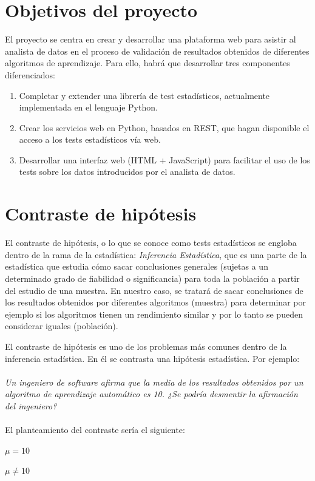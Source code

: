 \section{Objetivos del proyecto}
El proyecto se centra en crear y desarrollar una plataforma web para asistir al analista de datos
en el proceso de validación de resultados obtenidos de diferentes algoritmos de aprendizaje.
Para ello, habrá que desarrollar tres componentes diferenciados:
\begin{enumerate}
\item Completar y extender una librería de test estadísticos, actualmente implementada en el
lenguaje Python.
\item Crear los servicios web en Python, basados en REST, que hagan disponible el acceso a los
tests estadísticos vía web.
\item Desarrollar una interfaz web (HTML + JavaScript) para facilitar el uso de los tests sobre los
datos introducidos por el analista de datos.
\end{enumerate}

\section{Contraste de hipótesis}
El contraste de hipótesis, o lo que se conoce como tests estadísticos se engloba dentro de la rama de la
estadística: \textit{Inferencia Estadística}, que es una parte de la estadística que estudia cómo sacar
conclusiones generales (sujetas a un determinado grado de fiabilidad o significancia) para toda la población
a partir del estudio de una muestra. En nuestro caso, se tratará de sacar conclusiones de los resultados
obtenidos por diferentes algoritmos (muestra) para determinar por ejemplo si los algoritmos tienen un
rendimiento similar y por lo tanto se pueden considerar iguales (población).

El contraste de hipótesis es uno de los problemas más comunes dentro de la inferencia estadística. En él se
contrasta una hipótesis estadística. Por ejemplo:\\\\
\textit{Un ingeniero de software afirma que la media de los resultados obtenidos por un algoritmo
de aprendizaje automático es 10. ¿Se podría desmentir la afirmación del ingeniero?}\\\\
El planteamiento del contraste sería el siguiente:
\begin{center}
$ \mu = 10 $

$ \mu \neq 10 $
\end{center}


